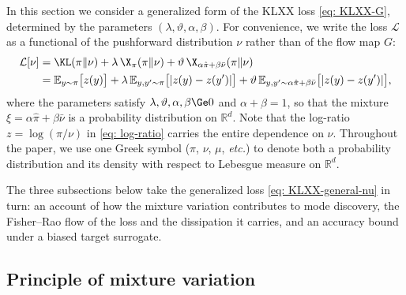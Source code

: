\documentclass{article}
\begin{document}
In this section we consider a generalized form of the KLXX loss \eqref{eq: KLXX-G}, determined by the parameters $(\lambda,\vartheta,\alpha,\beta)$. For convenience, we write the loss $\mathcal L$ as a functional of the pushforward distribution $\nu$ rather than of the flow map $G$:
\begin{align}
	\mathcal L[\nu] & =  \KL(\pi\|\nu) + \lambda\,\X_\pi(\pi\|\nu) + \vartheta\,\X_{\alpha\hat\pi+\beta\bar\nu}(\pi\|\nu) \notag \\
	& = \mathbb E_{y\sim\pi}\big[z(y)\big] +  \lambda\, \mathbb E_{y,y'\sim\pi}\big[|z(y)-z(y')|\big] + \vartheta\, \mathbb E_{y,y'\sim \alpha\hat\pi+\beta\bar\nu}\big[|z(y)-z(y')|\big],
	\label{eq: KLXX-general-nu}
\end{align}
where the parameters satisfy $\lambda,\vartheta,\alpha,\beta\Ge0$ and $\alpha+\beta=1$, so that the mixture $\xi = \alpha\hat\pi+\beta\bar\nu$ is a probability distribution on $\mathbb R^d$. Note that the log-ratio $z = \log(\pi/\nu)$ in \eqref{eq: log-ratio} carries the entire dependence on $\nu$. Throughout the paper, we use one Greek symbol ($\pi$, $\nu$, $\mu$, \emph{etc.}) to denote both a probability distribution and its density with respect to Lebesgue measure on $\mathbb R^d$.

The three subsections below take the generalized loss \eqref{eq: KLXX-general-nu} in turn: an account of how the mixture variation contributes to mode discovery, the Fisher--Rao flow of the loss and the dissipation it carries, and an accuracy bound under a biased target surrogate.

\subsection{Principle of mixture variation}
\label{subsec: mixture-variation}
\end{document}
